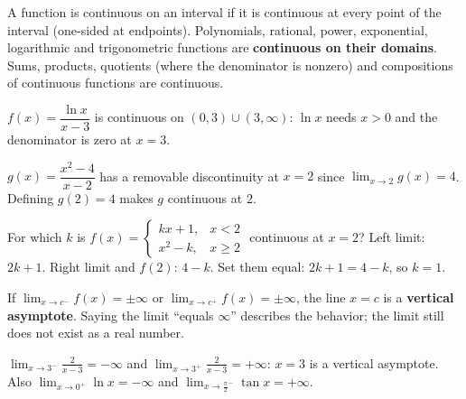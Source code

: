 \documentclass[11pt]{article}
\begin{document}
A function is continuous on an interval if it is continuous at every point of the interval (one-sided at endpoints). Polynomials, rational, power, exponential, logarithmic and trigonometric functions are \textbf{continuous on their domains}. Sums, products, quotients (where the denominator is nonzero) and compositions of continuous functions are continuous.

\begin{example}
$f(x)=\dfrac{\ln x}{x-3}$ is continuous on $(0,3)\cup(3,\infty)$: $\ln x$ needs $x>0$ and the denominator is zero at $x=3$.
\end{example}

\begin{example}
$g(x)=\dfrac{x^2-4}{x-2}$ has a removable discontinuity at $x=2$ since $\lim_{x\to2}g(x)=4$. Defining $g(2)=4$ makes $g$ continuous at $2$.
\end{example}
\begin{example}
For which $k$ is $f(x)=\begin{cases}kx+1, & x<2\\ x^2-k, & x\ge2\end{cases}$ continuous at $x=2$?
\sol Left limit: $2k+1$. Right limit and $f(2)$: $4-k$. Set them equal: $2k+1=4-k$, so $k=1$.
\end{example}

\begin{keyidea}
If $\displaystyle\lim_{x\to c^-}f(x)=\pm\infty$ or $\displaystyle\lim_{x\to c^+}f(x)=\pm\infty$, the line $x=c$ is a \textbf{vertical asymptote}. Saying the limit ``equals $\infty$'' describes the behavior; the limit still does not exist as a real number.
\end{keyidea}
\begin{example}
$\displaystyle\lim_{x\to3^-}\frac{2}{x-3}=-\infty$ and $\displaystyle\lim_{x\to3^+}\frac{2}{x-3}=+\infty$: $x=3$ is a vertical asymptote. Also $\displaystyle\lim_{x\to0^+}\ln x=-\infty$ and $\displaystyle\lim_{x\to\frac\pi2^-}\tan x=+\infty$.
\end{example}
\end{document}
